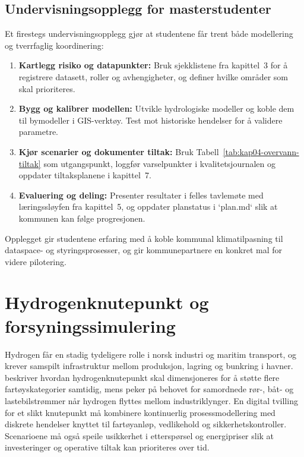 \subsection{Undervisningsopplegg for masterstudenter}
Et firestegs undervisningsopplegg gjør at studentene får trent både modellering og tverrfaglig koordinering:
\begin{enumerate}
    \item \textbf{Kartlegg risiko og datapunkter:} Bruk sjekklistene fra kapittel~3 for å registrere datasett, roller og avhengigheter, og definer hvilke områder som skal prioriteres.
    \item \textbf{Bygg og kalibrer modellen:} Utvikle hydrologiske modeller og koble dem til bymodeller i GIS-verktøy. Test mot historiske hendelser for å validere parametre.
    \item \textbf{Kjør scenarier og dokumenter tiltak:} Bruk Tabell~\ref{tab:kap04-overvann-tiltak} som utgangspunkt, loggfør varselpunkter i kvalitetsjournalen og oppdater tiltaksplanene i kapittel~7.
    \item \textbf{Evaluering og deling:} Presenter resultater i felles tavlemøte med læringssløyfen fra kapittel~5, og oppdater planstatus i `plan.md` slik at kommunen kan følge progresjonen.
\end{enumerate}
Opplegget gir studentene erfaring med å koble kommunal klimatilpasning til dataspace- og styringsprosesser, og gir kommunepartnere en konkret mal for videre pilotering.

\section{Hydrogenknutepunkt og forsyningssimulering}
Hydrogen får en stadig tydeligere rolle i norsk industri og maritim transport, og krever samspilt infrastruktur mellom produksjon, lagring og bunkring i havner. \citet{enova2024hydrogenknutepunkt} beskriver hvordan hydrogenknutepunkt skal dimensjoneres for å støtte flere fartøyskategorier samtidig, mens \citet{gassco2023hydrogen} peker på behovet for samordnede rør-, båt- og lastebilstrømmer når hydrogen flyttes mellom industriklynger. En digital tvilling for et slikt knutepunkt må kombinere kontinuerlig prosessmodellering med diskrete hendelser knyttet til fartøyanløp, vedlikehold og sikkerhetskontroller. Scenarioene må også speile usikkerhet i etterspørsel og energipriser slik at investeringer og operative tiltak kan prioriteres over tid.\citep{dnv2023hydrogenforecast}

